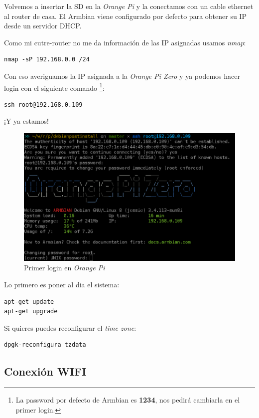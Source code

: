 \documentclass[12pt,spanish,]{scrartcl}
\begin{document}
Volvemos a insertar la SD en la \emph{Orange Pi} y la conectamos con un
cable ethernet al router de casa. El Armbian viene configurado por
defecto para obtener su IP desde un servidor DHCP.

Como mi cutre-router no me da información de las IP asignadas usamos
\emph{nmap}:

\begin{verbatim}
nmap -sP 192.168.0.0 /24
\end{verbatim}

Con eso averiguamos la IP asignada a la \emph{Orange Pi Zero} y ya
podemos hacer login con el siguiente comando \footnote{La password por
  defecto de Armbian es \textbf{1234}, nos pedirá cambiarla en el primer
  login.}:

\begin{verbatim}
ssh root@192.168.0.109
\end{verbatim}

¡Y ya estamos!

\begin{figure}[htbp]
\centering
\includegraphics{src/img/OrangePiZero_FirstLogin.png}
\caption{Primer login en \emph{Orange Pi}}
\end{figure}

Lo primero es poner al dia el sistema:

\begin{verbatim}
apt-get update
apt-get upgrade
\end{verbatim}

Si quieres puedes reconfigurar el \emph{time zone}:

\begin{verbatim}
dpgk-reconfigura tzdata
\end{verbatim}

\subsection{Conexión WIFI}\label{conexiuxf3n-wifi}
\end{document}
